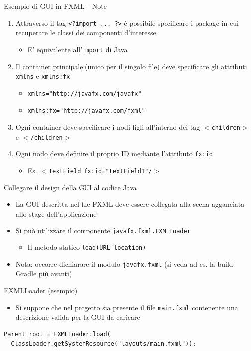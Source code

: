\documentclass[xcolor=dvipsnames,presentation]{beamer}
\begin{document}
\begin{frame}[fragile]{Esempio di GUI in FXML -- Note}
\begin{enumerate}\itemsep15pt
\item Attraverso il tag \texttt{<?import ... ?>} è possibile specificare i package in cui recuperare le classi dei componenti d'interesse
\begin{itemize}
\item E' equivalente all'\texttt{import} di Java
\end{itemize}
\item Il container principale (unico per il singolo file) \underline{deve} specificare gli attributi \texttt{xmlns} e \texttt{xmlns:fx}
\begin{itemize}
\item \begin{verbatim}xmlns="http://javafx.com/javafx"\end{verbatim}
\item \begin{verbatim}xmlns:fx="http://javafx.com/fxml"\end{verbatim}
\end{itemize}
\item Ogni container deve specificare i nodi figli all'interno dei tag \texttt{$<$children$>$} e \texttt{$<$/children$>$}
\item Ogni nodo deve definire il proprio ID mediante l'attributo \texttt{fx:id}
\begin{itemize}
\item Es. \texttt{$<$TextField fx:id="textField1"/$>$}
\end{itemize}
\end{enumerate}
\end{frame}

\begin{frame}[fragile]{Collegare il design della GUI al codice Java}
\begin{itemize}\itemsep10pt
\item La GUI descritta nel file FXML deve essere collegata alla scena agganciata allo stage dell'applicazione
\item Si può utilizzare il componente \texttt{javafx.fxml.FXMLLoader}
\begin{itemize}
\item Il metodo statico \texttt{load(URL location)}
\end{itemize}
\item Nota: occorre dichiarare il modulo \texttt{javafx.fxml} (si veda ad es. la build Gradle più avanti)
\end{itemize}
\begin{block}{FXMLLoader (esempio)}
\begin{itemize}
\item Si suppone che nel progetto sia presente il file \texttt{main.fxml} contenente una descrizione valida per la GUI da caricare
\end{itemize}
\begin{lstlisting}
Parent root = FXMLLoader.load(
  ClassLoader.getSystemResource("layouts/main.fxml"));
\end{lstlisting}
\end{block}
\end{frame}
\end{document}
